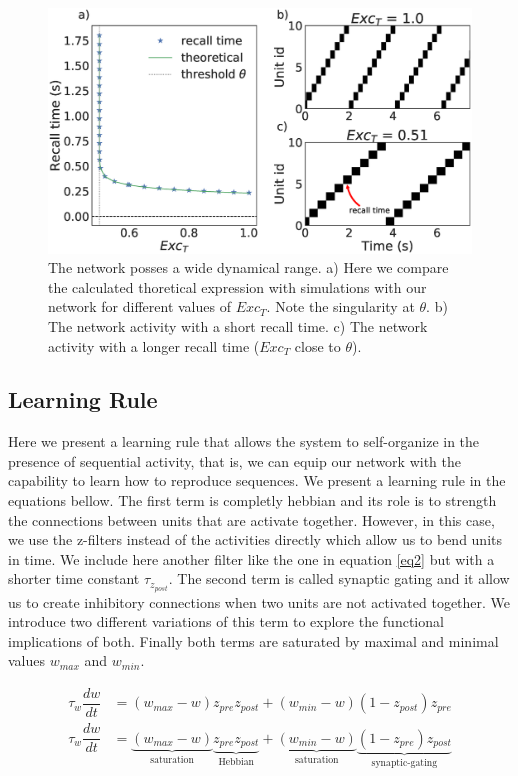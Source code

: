\documentclass{esannV2}
\begin{document}
\begin{figure}[h!]
\centering
\includegraphics[scale=0.25]{dynamical_range.eps}
\caption{The network posses a wide dynamical range. a) Here we compare the calculated thoretical expression with simulations with our network for different values of $Exc_T$. Note the singularity at $\theta$. b) The network activity with a short recall time. c) The network activity with a longer recall time ($Exc_T$ close to $\theta$).}\label{Fig:dynamical_range}
\end{figure}



\subsection{Learning Rule}
Here we present a learning rule that allows the system to self-organize in the presence of sequential activity, that is, we can equip our network with the capability to learn how to reproduce sequences. We present a learning rule in the equations bellow. The first term is completly hebbian \cite{hebb2005organization} and its role is to strength the connections between units that are activate together. However, in this case, we use the z-filters instead of the activities directly which allow us to bend units in time. We include here another filter like the one in equation \ref{eq2} but with a shorter time constant $\tau_{z_{post}}$. The second term is called synaptic gating \cite{andrew2003spiking} and it allow us to create inhibitory connections when two units are not activated together. We introduce two different variations of this term to explore the functional implications of both. Finally both terms are saturated by maximal and minimal values $w_{max}$ and $w_{min}$. 

\begin{align}
\tag{pre-synaptic}
\tau_w \dfrac{dw}{dt} &= (w_{max} - w) z_{pre}z_{post} + (w_{min} - w) (1 - z_{post})z_{pre} \label{eq:pre-synaptic rule}  \\
\tag{post-synaptic}
\tau_w \dfrac{dw}{dt} &= \underbrace{(w_{max} - w)}_{\text{saturation}} \underbrace{z_{pre}z_{post}}_{\text{Hebbian}} + \underbrace{(w_{min} - w)}_{\text{saturation}}\underbrace{ (1 - z_{pre})z_{post}}_{\text{synaptic-gating}} \label{eq:post-synaptic rule}
\end{align}
\end{document}
